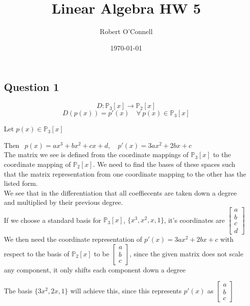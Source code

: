\documentclass{article}
\title{\textbf{Linear Algebra HW 5}}
\author{Robert O'Connell}
\date{\today}
\begin{document}
\maketitle
\vspace{5mm}


\subsection*{Question 1}

\[
D: \mathbb{P}_3[x] \rightarrow \mathbb{P}_2[x]
\]
\[
D(p(x)) = p  '(x) \quad \forall \ p(x) \in \mathbb{P}_3[x]
\]

Let \(p(x) \in \mathbb{P}_3[x]\)

Then \(\ \ p(x) = ax^3 + bx^2 + cx +d, \quad p'(x) = 3ax^2 + 2bx + c\)
\\

The matrix we see is defined from the coordinate mappings of \(\mathbb{P}_3[x]\) to the 
coordinate mapping of \(\mathbb{P}_2[x]\). We need to find the bases of these spaces such 
that the matrix representation from one coordinate mapping to the other has the listed form.
\\

We see that in the differentiation that all coeffiecents are taken down a degree and multiplied
by their previous degree.
\\
If we choose a standard basis for \(\mathbb{P}_3[x]\), \(\{x^3, x^2, x, 1\}\), it's coordinates are
\(\begin{bmatrix}
    a \\ b \\ c \\ d
\end{bmatrix}\)
\\

We then need the coordinate representation of \(p'(x) = 3ax^2 + 2bx + c\) with respect to the basis 
of \(\mathbb{P}_2[x]\) to be \(\begin{bmatrix}
    a \\ b \\ c
\end{bmatrix}\), since the given matrix does not scale any component, it only shifts each component 
down a degree

The basis \(\{3x^2, 2x , 1\}\) will achieve this, since this represents \(p'(x)\) as 
\(\begin{bmatrix}
    a \\ b \\ c
\end{bmatrix}\)
\end{document}
